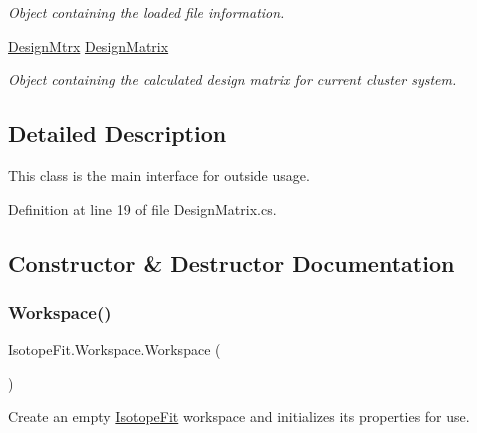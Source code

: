 \begin{DoxyCompactItemize}
\begin{DoxyCompactList}\small\item\em Object containing the loaded file information. \end{DoxyCompactList}\item 
\hyperlink{class_isotope_fit_1_1_workspace_1_1_design_mtrx}{Design\+Mtrx} \hyperlink{class_isotope_fit_1_1_workspace_ae24a2ee8f965fb2ed7ad3a592163271d}{Design\+Matrix}
\begin{DoxyCompactList}\small\item\em Object containing the calculated design matrix for current cluster system. \end{DoxyCompactList}\end{DoxyCompactItemize}


\subsection{Detailed Description}
This class is the main interface for outside usage. 



Definition at line 19 of file Design\+Matrix.\+cs.



\subsection{Constructor \& Destructor Documentation}
\mbox{\label{class_isotope_fit_1_1_workspace_affa8b6ac937cee367c225c606782da17}} 
\subsubsection{\texorpdfstring{Workspace()}{Workspace()}\hspace{0.1cm}{\footnotesize\ttfamily [1/2]}}
{\footnotesize\ttfamily Isotope\+Fit.\+Workspace.\+Workspace (\begin{DoxyParamCaption}{ }\end{DoxyParamCaption})}



Create an empty \hyperlink{namespace_isotope_fit}{Isotope\+Fit} workspace and initializes its properties for use. 



